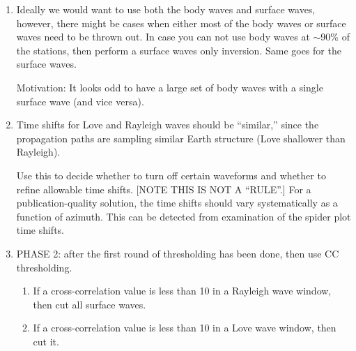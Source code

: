 \begin{enumerate}
\begin{enumerate}


\item Ideally we would want to use both the body waves and surface waves, however, there might be cases when either most of the body waves or surface waves need to be thrown out. In case you can not use body waves at $\sim$90\% of the stations, then perform a surface waves only inversion. Same goes for the surface waves.

Motivation: It looks odd to have a large set of body waves with a single surface wave (and vice versa).


\item Time shifts for Love and Rayleigh waves should be ``similar,'' since the propagation paths are sampling similar Earth structure (Love shallower than Rayleigh). 

Use this to decide whether to turn off certain waveforms and whether to refine allowable time shifts. [NOTE THIS IS NOT A ``RULE''.] For a publication-quality solution, the time shifts should vary systematically as a function of azimuth. This can be detected from examination of the spider plot time shifts.

\item PHASE 2: after the first round of thresholding has been done, then use CC thresholding.
\begin{enumerate}
\item If a cross-correlation value is less than 10 in a Rayleigh wave window, then cut all surface waves.
\item If a cross-correlation value is less than 10 in a Love wave window, then cut it.
\end{enumerate}

\end{enumerate}


\end{enumerate}

%
%
